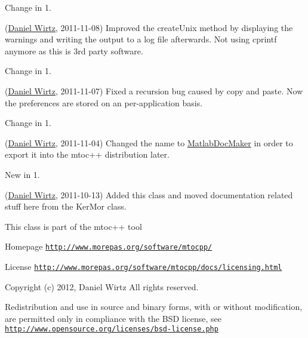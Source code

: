 \begin{DoxyRefDesc}{Change in 1.}
\item[\hyperlink{changelog1_2__changelog1_2000002}{Change in 1.\+2}](\hyperlink{developers_dw}{Daniel Wirtz}, 2011-\/11-\/08) Improved the create\+Unix method by displaying the warnings and writing the output to a log file afterwards. Not using cprintf anymore as this is 3rd party software.\end{DoxyRefDesc}


\begin{DoxyRefDesc}{Change in 1.}
\item[\hyperlink{changelog1_2__changelog1_2000003}{Change in 1.\+2}](\hyperlink{developers_dw}{Daniel Wirtz}, 2011-\/11-\/07) Fixed a recursion bug caused by copy and paste. Now the preferences are stored on an per-\/application basis.\end{DoxyRefDesc}


\begin{DoxyRefDesc}{Change in 1.}
\item[\hyperlink{changelog1_2__changelog1_2000004}{Change in 1.\+2}](\hyperlink{developers_dw}{Daniel Wirtz}, 2011-\/11-\/04) Changed the name to \hyperlink{class_matlab_doc_maker}{Matlab\+Doc\+Maker} in order to export it into the mtoc++ distribution later.\end{DoxyRefDesc}


\begin{DoxyRefDesc}{New in 1.}
\item[\hyperlink{newfeat1_2__newfeat1_2000001}{New in 1.\+2}](\hyperlink{developers_dw}{Daniel Wirtz}, 2011-\/10-\/13) Added this class and moved documentation related stuff here from the Ker\+Mor class.\end{DoxyRefDesc}


This class is part of the mtoc++ tool
\begin{DoxyItemize}
\item {\ttfamily Homepage} \href{http://www.morepas.org/software/mtocpp/}{\tt http\+://www.\+morepas.\+org/software/mtocpp/}
\item {\ttfamily License} \href{http://www.morepas.org/software/mtocpp/docs/licensing.html}{\tt http\+://www.\+morepas.\+org/software/mtocpp/docs/licensing.\+html}
\end{DoxyItemize}

Copyright (c) 2012, Daniel Wirtz All rights reserved.

Redistribution and use in source and binary forms, with or without modification, are permitted only in compliance with the B\+S\+D license, see \href{http://www.opensource.org/licenses/bsd-license.php}{\tt http\+://www.\+opensource.\+org/licenses/bsd-\/license.\+php} 

